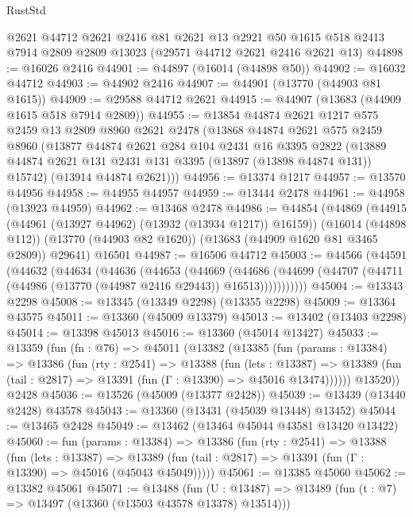 \begin{lexlean}{RustStd}
\begin{coremodule}
    @2621
    @44712
    @2621
    @2416
    @81
    @2621
    @13
    @2921
    @50
    @1615
    @518
    @2413
    @7914
    @2809
    @2809
    @13023
    (@29571 @44712 @2621 @2416 @2621 @13)
@44898 := @16026 @2416
@44901 := @44897 (@16014 (@44898 @50))
@44902 := @16032 @44712
@44903 := @44902 @2416
@44907 := @44901 (@13770 (@44903 @81 @1615))
@44909 := @29588 @44712 @2621
@44915 := @44907 (@13683 (@44909 @1615 @518 @7914 @2809))
@44955 := @13854
    @44874
    @2621
    @1217
    @575
    @2459
    @13
    @2809
    @8960
    @2621
    @2478
    (@13868
      @44874
      @2621
      @575
      @2459
      @8960
      (@13877
        @44874
        @2621
        @284
        @104
        @2431
        @16
        @3395
        @2822
        (@13889 @44874 @2621 @131 @2431 @131 @3395 (@13897 (@13898 @44874 @131)) @15742)
        (@13914 @44874 @2621)))
@44956 := @13374 @1217
@44957 := @13570 @44956
@44958 := @44955 @44957
@44959 := @13444 @2478
@44961 := @44958 (@13923 @44959)
@44962 := @13468 @2478
@44986 := @44854
    (@44869
      (@44915 (@44961 (@13927 @44962) (@13932 (@13934 @1217)) @16159))
      (@16014 (@44898 @112))
      (@13770 (@44903 @82 @1620))
      (@13683 (@44909 @1620 @81 @3465 @2809))
      @29641)
    @16501
@44987 := @16506 @44712
@45003 := @44566
    (@44591
      (@44632
        (@44634
          (@44636
            (@44653
              (@44669
                (@44686
                  (@44699 (@44707 (@44711 (@44986 (@13770 (@44987 @2416 @29443)) @16513)))))))))))
@45004 := @13343 @2298
@45008 := @13345 (@13349 @2298) (@13355 @2298)
@45009 := @13364 @43575
@45011 := @13360 (@45009 @13379)
@45013 := @13402 (@13403 @2298)
@45014 := @13398 @45013
@45016 := @13360 (@45014 @13427)
@45033 := @13359
    (fun (fn : @76) =>
    @45011
      (@13382
        (@13385
          (fun (params : @13384) =>
          @13386
            (fun (rty : @2541) =>
            @13388
              (fun (lets : @13387) =>
              @13389 (fun (tail : @2817) => @13391 (fun (Γ : @13390) => @45016 @13474))))))
        @13520))
    @2428
@45036 := @13526 (@45009 (@13377 @2428))
@45039 := @13439 (@13440 @2428) @43578
@45043 := @13360 (@13431 (@45039 @13448) @13452)
@45044 := @13465 @2428
@45049 := @13462 (@13464 @45044 @43581 @13420 @13422)
@45060 := fun (params : @13384) =>
  @13386
    (fun (rty : @2541) =>
    @13388
      (fun (lets : @13387) =>
      @13389 (fun (tail : @2817) => @13391 (fun (Γ : @13390) => @45016 (@45043 @45049)))))
@45061 := @13385 @45060
@45062 := @13382 @45061
@45071 := @13488
    (fun (U : @13487) => @13489 (fun (t : @7) => @13497 (@13360 (@13503 @43578 @13378) @13514)))

\end{coremodule}
\end{lexlean}
